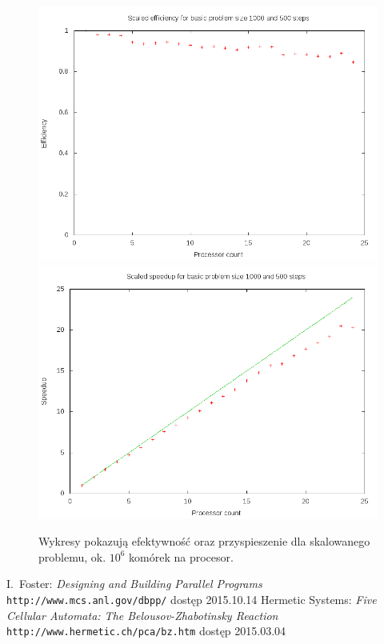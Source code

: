 \documentclass[a4paper; 12pt]{article}
\begin{document}
\begin{figure}
    \centering
    \includegraphics[width=.45\textwidth]{fig/scaled_1000_e.png}
    \hfill
    \includegraphics[width=.45\textwidth]{fig/scaled_1000_s.png}
    \caption{Wykresy pokazują efektywność oraz przyspieszenie dla skalowanego
        problemu, ok. $10^6$ komórek na procesor.}
    \label{fig:s1000}
\end{figure}


\begin{thebibliography}{9}
        I.~Foster: \emph{Designing and Building Parallel Programs}
        \texttt{http://www.mcs.anl.gov/dbpp/} dostęp 2015.10.14
        Hermetic Systems: \emph{Five Cellular Automata: The Belousov-Zhabotinsky Reaction}
        \texttt{http://www.hermetic.ch/pca/bz.htm} dostęp 2015.03.04
\end{thebibliography}
\end{document}

